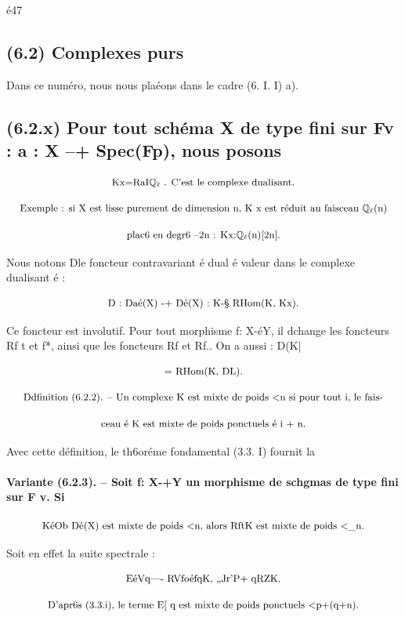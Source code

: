 \documentclass[11pt]{article}
\theoremstyle{remark}
\begin{document}
é47

\subsection*{(6.2) Complexes purs}

Dans ce numéro, nous nous plaéons dans le cadre (6. I. I) a).

\subsection*{(6.2.x) Pour tout schéma X de type fini sur Fv : a : X --+ Spec(Fp), nous posons}

\[\text{\small Kx=RaI\(\mathbb{Q}_{\ell}\) . C'est le complexe dualisant.}\]

\[\text{\small Exemple : si X est lisse purement de dimension n, K x est réduit au faisceau \(\mathbb{Q}_{\ell}\)(n)}\]

\[\text{\small plac6 en degr6 --2n : Kx:\(\mathbb{Q}_{\ell}\)(n)[2n].}\]

Nous notons Dle foncteur contravariant é dual é valeur dans le complexe dualisant é :

\[\text{\small D : Daé(X) -+ Dé(X) : K-§ RHom(K, Kx).}\]

Ce foncteur est involutif. Pour tout morphisme f: X-éY, il dchange les foncteurs Rf t et f*, ainsi que les foncteurs Rf et Rf.. On a aussi : D(K|

\[\text{\small = RHom(K, DL).}\]

\[\text{\small Ddfinition (6.2.2). -- Un complexe K est mixte de poids <n si pour tout i, le fais-}\]

\[\text{\small ceau é K est mixte de poids ponctuels é i + n.}\]

Avec cette définition, le th6oréme fondamental (3.3. I) fournit la

\paragraph{Variante (6.2.3). -- Soit f: X-+Y un morphisme de schgmas de type fini sur F v. Si}

\[\text{\small KéOb Dé(X) est mixte de poids <n, alors RftK est mixte de poids <\_n.}\]

Soit en effet la suite spectrale :

\[\text{\small EéVq---- RVfoéfqK, ,,Jr'P+ qRZK.}\]

\[\text{\small D'apr6s (3.3.i), le terme E[ q est mixte de poids ponctuels <p+(q+n).}\]
\end{document}
